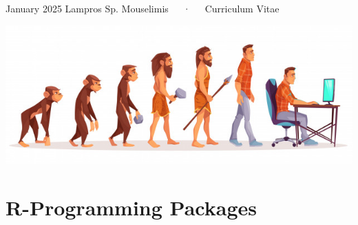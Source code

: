 \documentclass[11pt, a4paper]{awesome-cv}
\begin{document}
\makecvheader

\makecvfooter
  {January 2025}
    {Lampros Sp. Mouselimis~~~·~~~Curriculum Vitae}
  {\thepage}





\includegraphics{human_evolution.jpg}

\hypertarget{r-programming-packages}{%
\section{R-Programming Packages}\label{r-programming-packages}}
\end{document}
